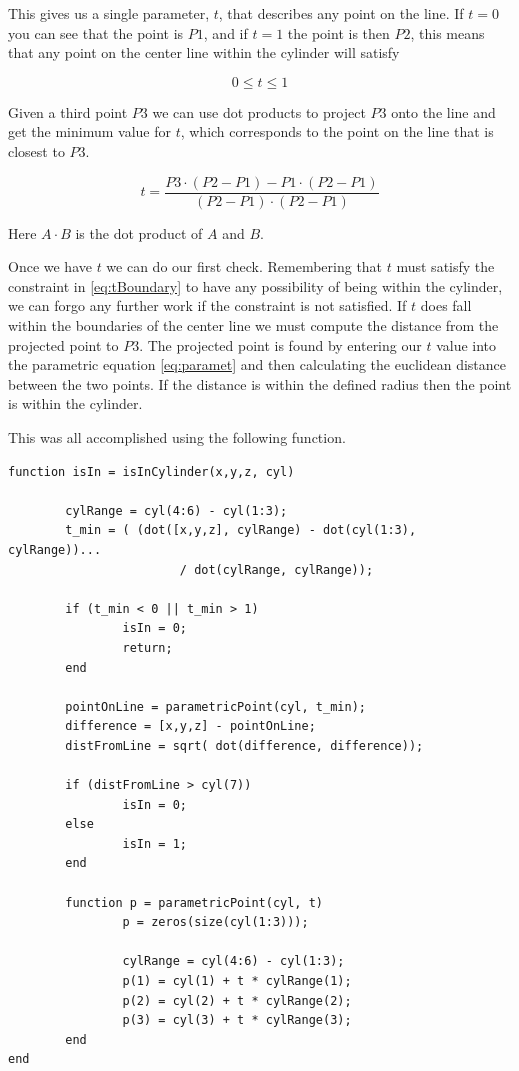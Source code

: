 \documentclass[authoryearcitations]{UoYCSproject}
\begin{document}
This gives us a single parameter, $t$, that describes any point on the line. If $t = 0$ you can see that the
point is $P1$, and if $t = 1$ the point is then $P2$, this means that any point on the center line within the cylinder
will satisfy 

\begin{equation}
0 \leq t \leq 1 
\label{eq:tBoundary}
\end{equation}

Given a third point $P3$ we can use dot products to 
project $P3$ onto the line and get the minimum value for $t$, which corresponds to the point on the line 
that is closest to $P3$. 

\begin{equation}
t = \frac{P3 \cdot (P2 - P1) - P1 \cdot (P2 - P1)}{(P2 - P1) \cdot (P2 - P1)}
\label{eq:dotProd}
\end{equation}

Here $A \cdot B$ is the dot product of $A$ and $B$. 

Once we have $t$ we can do our first check. Remembering that $t$ must satisfy the constraint in \ref{eq:tBoundary} 
to have any possibility
of being within the cylinder, we can forgo any further work if the constraint is not satisfied. If $t$ does fall within the
boundaries of the center line we must compute the distance from the projected point to $P3$. The projected point is
found by entering our $t$ value into the parametric equation \ref{eq:paramet} and then calculating the euclidean
distance between the two points. If the distance is within the defined radius then the point is within the cylinder. 

This was all accomplished using the following function. 


\begin{lstlisting}[caption={Finding if a point is within a cylinder}, label=lst:isInCyl]
function isIn = isInCylinder(x,y,z, cyl)
	
        cylRange = cyl(4:6) - cyl(1:3);
        t_min = ( (dot([x,y,z], cylRange) - dot(cyl(1:3), cylRange))... 
                        / dot(cylRange, cylRange));
        
        if (t_min < 0 || t_min > 1)
                isIn = 0;
                return;
        end
        
        pointOnLine = parametricPoint(cyl, t_min);
        difference = [x,y,z] - pointOnLine;
        distFromLine = sqrt( dot(difference, difference));
        
        if (distFromLine > cyl(7))
                isIn = 0;
        else
                isIn = 1;
        end

        function p = parametricPoint(cyl, t)
                p = zeros(size(cyl(1:3)));
                
                cylRange = cyl(4:6) - cyl(1:3);
                p(1) = cyl(1) + t * cylRange(1);
                p(2) = cyl(2) + t * cylRange(2);
                p(3) = cyl(3) + t * cylRange(3);
        end		
end
\end{lstlisting}
\end{document}

